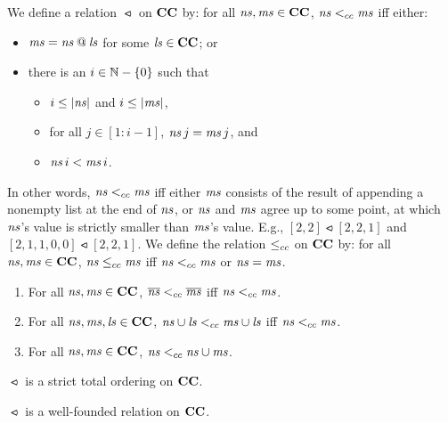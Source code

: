 We define a relation $\ltcc$ on $\mathbf{CC}$ by: for all ${\it ns},{\it ms}\in\mathbf{CC}$,
${\it ns}\mathrel{<_{cc}}{\it ms}$ iff either:
\begin{itemize}
\item ${\it ms} = {\it ns} \mathbin{@} {\it ls}$ for some ${\it ls}\in\mathbf{CC}$; or

\item there is an $i\in\mathbb{N} - \{0\}$ such that
  \begin{itemize}
  \item $i\leq|{\it ns}|$ and $i\leq|{\it ms}|$,

  \item for all $j\in[1:i-1]$, ${\it ns}\,j = {\it ms}\,j$, and

  \item ${\it ns}\,i < {\it ms}\,i$.
  \end{itemize}
\end{itemize}
In other words, ${\it ns}\mathrel{<_{cc}}{\it ms}$ iff either ${\it ms}$ consists of the
result of appending a nonempty list at the end of ${\it ns}$, or
${\it ns}$ and ${\it ms}$ agree up to some point, at which ${\it ns}$'s value
is strictly smaller than ${\it ms}$'s value.  E.g.,
$[2, 2]\ltcc[2, 2, 1]$ and $[2,1,1,0,0]\ltcc[2, 2, 1]$.
We define the relation $\mathrel{\leq_{cc}}$ on $\mathbf{CC}$ by: for all ${\it ns},{\it ms}\in\mathbf{CC}$,
${\it ns}\mathrel{\leq_{cc}}{\it ms}$ iff ${\it ns}\mathrel{<_{cc}}{\it ms}$ or ${\it ns}={\it ms}$.

\begin{proposition}
\label{CCLTContext}
\begin{enumerate}[\quad(1)]
\item For all ${\it ns},{\it ms}\in\mathbf{CC}$, $\overline{{\it ns}} \mathrel{<_{cc}} \overline{{\it ms}}$ iff
  ${\it ns}\mathrel{<_{cc}}{\it ms}$.

\item For all ${\it ns},{\it ms},{\it ls}\in\mathbf{CC}$, ${\it ns}\cup{\it ls} \mathrel{<_{cc}} {\it ms}\cup{\it ls}$ iff
  ${\it ns} \mathrel{<_{cc}} {\it ms}$.

\item For all ${\it ns},{\it ms}\in\mathbf{CC}$, ${\it ns}\mathrel{<_{cc}}{\it ns}\cup{\it ms}$.
\end{enumerate}
\end{proposition}

\begin{proposition}
$\ltcc$ is a strict total ordering on $\mathbf{CC}$.
\end{proposition}

\begin{proposition}
\label{LTCCWellFounded}
$\ltcc$ is a well-founded relation on $\mathbf{CC}$.
\end{proposition}

